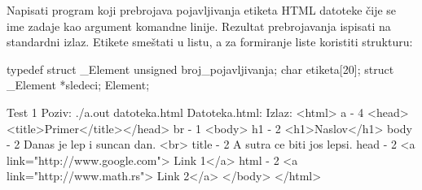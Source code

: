 \begin{Exercise}[label=606]
Napisati program koji prebrojava pojavljivanja etiketa HTML 
datoteke čije se ime zadaje kao argument komandne linije. Rezultat prebrojavanja 
ispisati na standardni izlaz. Etikete smeštati u listu, a za formiranje liste koristiti strukturu:
\begin{ckod} 
 typedef struct _Element
 {
   unsigned broj_pojavljivanja;
   char etiketa[20];
   struct _Element *sledeci;
 } Element;
\end{ckod}

\begin{maxitest}
    \begin{test}{Test 1}
Poziv: ./a.out datoteka.html
Datoteka.html:                                     Izlaz:
<html>                                             a - 4
  <head><title>Primer</title></head>               br - 1
  <body>                                           h1 - 2
    <h1>Naslov</h1>                                body - 2
    Danas je lep i suncan dan. <br>                title - 2
    A sutra ce biti jos lepsi.                     head - 2
    <a link="http://www.google.com"> Link 1</a>    html - 2
    <a link="http://www.math.rs"> Link 2</a>
  </body>
</html>
    \end{test}
\end{maxitest}

\end{Exercise}
\begin{Answer}[ref=606]
\end{Answer}



